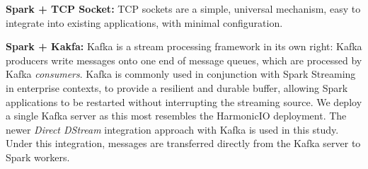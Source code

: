 \documentclass[conference]{IEEEtran}
\begin{document}

\textbf{Spark + TCP Socket:} TCP sockets are a simple, universal mechanism, easy to integrate into existing applications, with minimal configuration. 


\textbf{Spark + Kakfa:} Kafka is a stream processing framework in its own right: Kafka producers write messages onto one end of message queues, which are processed by Kafka \emph{consumers}. 
Kafka is commonly used in conjunction with Spark Streaming in enterprise contexts, to provide a resilient and durable buffer, allowing Spark applications to be restarted without interrupting the streaming source. We deploy a single Kafka server as this most resembles the HarmonicIO deployment. 
The newer \emph{Direct DStream} integration approach with Kafka is used in this study. Under this integration, messages are transferred directly from the Kafka server to Spark workers.
\end{document}
